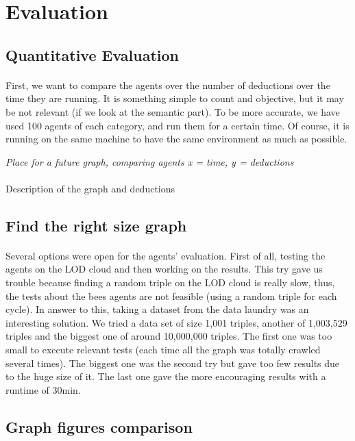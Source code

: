 \documentclass{article}
\begin{document}
\section{Evaluation}
	\subsection{Quantitative Evaluation}
	\paragraph{}
	First, we want to compare the agents over the number of deductions over the time they are running.
	It is something simple to count and objective, but it may be not relevant (if we look at the semantic part).
	To be more accurate, we have used 100 agents of each category, and run them for a certain time.
	Of course, it is running on the same machine to have the same environment as much as possible.
	\begin{center}
	\textit{Place for a future graph, comparing agents x = time, y = deductions}
	\end{center}
	\paragraph{}
	Description of the graph and deductions
	\subsection{Find the right size graph}
	\paragraph{}
	Several options were open for the agents' evaluation.
	First of all, testing the agents on the LOD cloud and then working on the results.
	This try gave us trouble because finding a random triple on the LOD cloud is really slow,
	thus, the tests about the bees agents are not feasible (using a random triple for each cycle).
	In answer to this, taking a dataset from the data laundry was an interesting solution.
	We tried a data set of size 1,001 triples, another of 1,003,529 triples and the biggest one of around 10,000,000 triples.
	The first one was too small to execute relevant tests (each time all the graph was totally crawled several times).
	The biggest one was the second try but gave too few results due to the huge size of it.
	The last one gave the more encouraging results with a runtime of 30min.
	\subsection{Graph figures comparison}
\end{document}
